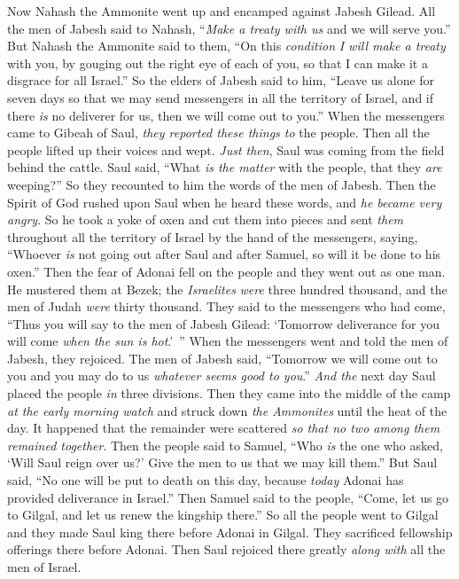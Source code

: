 \begin{biblechapter} %
 Now Nahash the Ammonite went up and encamped against Jabesh Gilead. All the men of Jabesh said to Nahash, “\textit{Make a treaty with us} and we will serve you.”
\verse But Nahash the Ammonite said to them, “On this \textit{condition} \textit{I will make a treaty} with you, by gouging out the right eye of each of you, so that I can make it a disgrace for all Israel.”
\verse So the elders of Jabesh said to him, “Leave us alone for seven days so that we may send messengers in all the territory of Israel, and if there \textit{is} no deliverer for us, then we will come out to you.”
\verse When the messengers came to Gibeah of Saul, \textit{they reported these things to} the people. Then all the people lifted up their voices and wept.
\verse \textit{Just then}, Saul was coming from the field behind the cattle. Saul said, “What \textit{is the matter} with the people, that they \textit{are} weeping?” So they recounted to him the words of the men of Jabesh.
\verse Then the Spirit of God rushed upon Saul when he heard these words, and \textit{he became very angry}.
\verse So he took a yoke of oxen and cut them into pieces and sent \textit{them} throughout all the territory of Israel by the hand of the messengers, saying, “Whoever \textit{is} not going out after Saul and after Samuel, so will it be done to his oxen.” Then the fear of Adonai fell on the people and they went out as one man.
\verse He mustered them at Bezek; the \textit{Israelites} \textit{were} three hundred thousand, and the men of Judah \textit{were} thirty thousand.
\verse They said to the messengers who had come, “Thus you will say to the men of Jabesh Gilead: ‘Tomorrow deliverance for you will come \textit{when the sun is hot}.’ ” When the messengers went and told the men of Jabesh, they rejoiced.
\verse The men of Jabesh said, “Tomorrow we will come out to you and you may do to us \textit{whatever seems good to you}.”
\verse \textit{And the} next day Saul placed the people \textit{in} three divisions. Then they came into the middle of the camp \textit{at the early morning watch} and struck down \textit{the Ammonites} until the heat of the day. It happened that the remainder were scattered \textit{so that no two among them remained together}.
\verse Then the people said to Samuel, “Who \textit{is} the one who asked, ‘Will Saul reign over us?’ Give the men to us that we may kill them.”
\verse But Saul said, “No one will be put to death on this day, because \textit{today} Adonai has provided deliverance in Israel.”
\verse Then Samuel said to the people, “Come, let us go to Gilgal, and let us renew the kingship there.”
\verse So all the people went to Gilgal and they made Saul king there before Adonai in Gilgal. They sacrificed fellowship offerings there before Adonai. Then Saul rejoiced there greatly \textit{along with} all the men of Israel.
\end{biblechapter}

